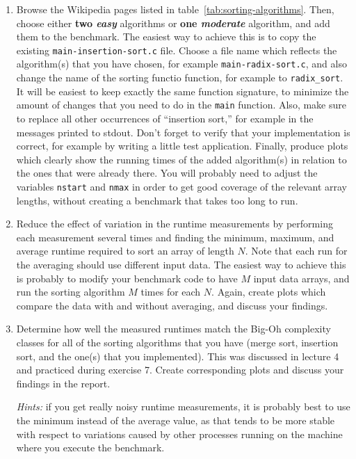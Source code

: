 \documentclass[a4paper,10pt]{article}
\begin{document}
\begin{enumerate}

\item
  Browse the Wikipedia pages listed in table~\ref{tab:sorting-algorithms}.
  Then, choose either \textbf{two \emph{easy}} algorithms or \textbf{one \emph{moderate}} algorithm, and add them to the benchmark.
  The easiest way to achieve this is to copy the existing \texttt{main-insertion-sort.c} file.
  Choose a file name which reflects the algorithm(s) that you have chosen, for example \texttt{main-radix-sort.c}, and also change the name of the sorting functio function, for example to \texttt{radix\_sort}.
  It will be easiest to keep exactly the same function signature, to minimize the amount of changes that you need to do in the \texttt{main} function.
  Also, make sure to replace all other occurrences of ``insertion sort,'' for example in the messages printed to stdout.
  Don't forget to verify that your implementation is correct, for example by writing a little test application.
  Finally, produce plots which clearly show the running times of the added algorithm(s) in relation to the ones that were already there.
  You will probably need to adjust the variables \texttt{nstart} and \texttt{nmax} in order to get good coverage of the relevant array lengths, without creating a benchmark that takes too long to run.
  
\item
  Reduce the effect of variation in the runtime measurements by performing each measurement several times and finding the minimum, maximum, and average runtime required to sort an array of length $N$.
  Note that each run for the averaging should use different input data.
  The easiest way to achieve this is probably to modify your benchmark code to have $M$ input data arrays, and run the sorting algorithm $M$ times for each $N$.
  Again, create plots which compare the data with and without averaging, and discuss your findings.
  
\item
  Determine how well the measured runtimes match the Big-Oh complexity classes for all of the sorting algorithms that you have (merge sort, insertion sort, and the one(s) that you implemented).
  This was discussed in lecture 4 and practiced during exercise 7.
  Create corresponding plots and discuss your findings in the report.
  
  \emph{Hints:} if you get really noisy runtime measurements, it is probably best to use the minimum instead of the average value, as that tends to be more stable with respect to variations caused by other processes running on the machine where you execute the benchmark.

\end{enumerate}
\end{document}
